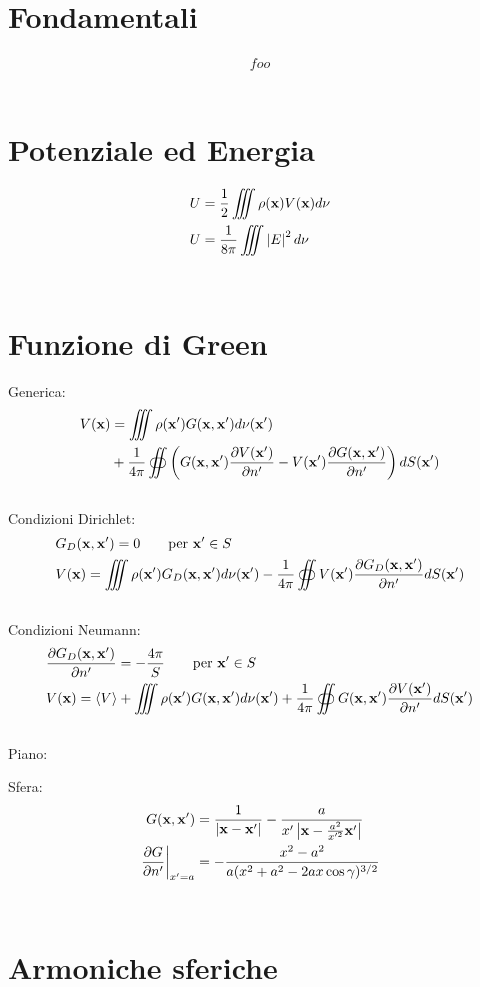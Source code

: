 \documentclass{article}
\providecommand{\abs}[1]{\left|#1\right|}
\providecommand{\p}{\partial}
\begin{document}
\section{Fondamentali}
\begin{align*}
foo
\end{align*} \\

\section{Potenziale ed Energia}
\begin{align*}
	U &= \frac{1}{2} \iiint \rho({\bf x})V({\bf x}) d\nu \\
	U &= \frac{1}{8\pi} \iiint \abs{E}^2 d\nu
\end{align*} \\

\section{Funzione di Green}

Generica:
\begin{align*}
	V({\bf x}) &= \iiint \rho({\bf x'})G({\bf x},{\bf x'}) d\nu({\bf x'})\\%
			   &+ \frac{1}{4\pi} \oiint \left(%
		G({\bf x},{\bf x'})\frac{\p V({\bf x'})}{\p n'} - V({\bf x'}) \frac{\p G({\bf x},{\bf x'})}{\p n'}%
	\right) dS({\bf x'})
\end{align*} \\

Condizioni Dirichlet:
\begin{align*}
	&G_D({\bf x},{\bf x'}) = 0 \qquad \text{per } {\bf x'} \in S \\
	&V({\bf x}) = \iiint \rho({\bf x'})G_D({\bf x},{\bf x'}) d\nu({\bf x'})%
		- \frac{1}{4\pi} \oiint V({\bf x'}) \frac{\p G_D({\bf x},{\bf x'})}{\p n'} dS({\bf x'})
\end{align*} \\

Condizioni Neumann:
\begin{align*}
	&\frac{\p G_D({\bf x},{\bf x'})}{\p n'} = - \frac{4\pi}{S} \qquad \text{per } {\bf x'} \in S \\
	&V({\bf x}) = \langle V \rangle + \iiint \rho({\bf x'})G({\bf x},{\bf x'}) d\nu({\bf x'})%
		+ \frac{1}{4\pi} \oiint G({\bf x},{\bf x'})\frac{\p V({\bf x'})}{\p n'} dS({\bf x'})
\end{align*} \\

Piano:

Sfera:
\begin{align*}
	G({\bf x}, {\bf x'}) &= \frac{1}{\abs{{\bf x} - {\bf x'}}} - \frac{a}{x'\abs{{{\bf x} - \frac{a^2}{x'^2}{\bf x'}}}} \\
	\left. \frac{\p G}{\p n'} \right|_{x'=a} &= - \frac{x^2 - a^2}{a(x^2 + a^2 - 2ax\cos \gamma)^{3/2}}
\end{align*} \\

\section{Armoniche sferiche}
\end{document}
